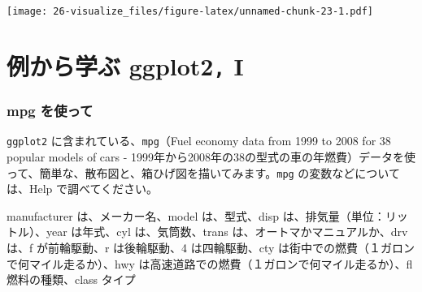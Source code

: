 \documentclass[
  xelatex, ja=standard]{bxjsbook}
\theoremstyle{definition}
\theoremstyle{definition}
\theoremstyle{definition}
\theoremstyle{definition}
\theoremstyle{remark}
\begin{document}
\texttt{[image: 26-visualize\_files/figure-latex/unnamed-chunk-23-1.pdf]}

\hypertarget{ux4f8bux304bux3089ux5b66ux3076-ggplot2-i}{%
\section{\texorpdfstring{例から学ぶ ggplot2\texttt{,} I}{例から学ぶ ggplot2, I}}\label{ux4f8bux304bux3089ux5b66ux3076-ggplot2-i}}

\hypertarget{mpg-ux3092ux4f7fux3063ux3066}{%
\subsubsection{mpg を使って}\label{mpg-ux3092ux4f7fux3063ux3066}}

\texttt{ggplot2} に含まれている、\texttt{mpg}（Fuel economy data from 1999 to 2008 for 38 popular models of cars - 1999年から2008年の38の型式の車の年燃費）データを使って、簡単な、散布図と、箱ひげ図を描いてみます。\texttt{mpg} の変数などについては、Help で調べてください。

manufacturer は、メーカー名、model は、型式、disp は、排気量（単位：リットル）、year は年式、cyl は、気筒数、trans は、オートマかマニュアルか、drv は、f が前輪駆動、r は後輪駆動、4 は四輪駆動、cty は街中での燃費（１ガロンで何マイル走るか）、hwy は高速道路での燃費（１ガロンで何マイル走るか）、fl 燃料の種類、class タイプ
\end{document}

